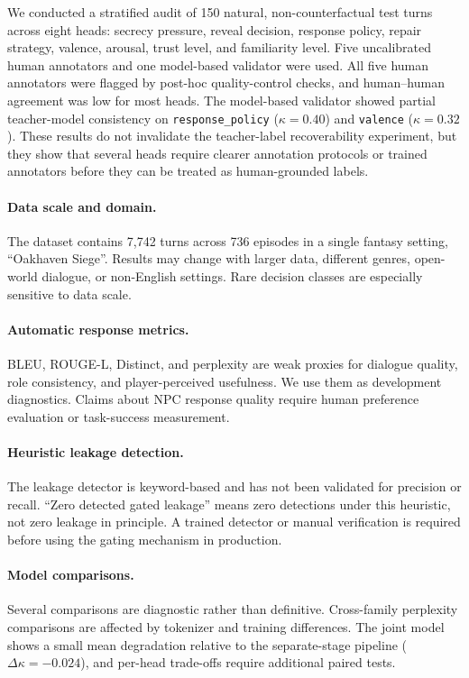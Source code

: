 \documentclass[11pt]{article}
\begin{document}
We conducted a stratified audit of 150 natural, non-counterfactual test turns across eight heads: secrecy pressure, reveal decision, response policy, repair strategy, valence, arousal, trust level, and familiarity level.
Five uncalibrated human annotators and one model-based validator were used.
All five human annotators were flagged by post-hoc quality-control checks, and human--human agreement was low for most heads.
The model-based validator showed partial teacher-model consistency on \texttt{response\_policy} ($\kappa{=}0.40$) and \texttt{valence} ($\kappa{=}0.32$).
These results do not invalidate the teacher-label recoverability experiment, but they show that several heads require clearer annotation protocols or trained annotators before they can be treated as human-grounded labels.

\paragraph{Data scale and domain.}
The dataset contains 7,742 turns across 736 episodes in a single fantasy setting, ``Oakhaven Siege''.
Results may change with larger data, different genres, open-world dialogue, or non-English settings.
Rare decision classes are especially sensitive to data scale.

\paragraph{Automatic response metrics.}
BLEU, ROUGE-L, Distinct, and perplexity are weak proxies for dialogue quality, role consistency, and player-perceived usefulness.
We use them as development diagnostics.
Claims about NPC response quality require human preference evaluation or task-success measurement.

\paragraph{Heuristic leakage detection.}
The leakage detector is keyword-based and has not been validated for precision or recall.
``Zero detected gated leakage'' means zero detections under this heuristic, not zero leakage in principle.
A trained detector or manual verification is required before using the gating mechanism in production.

\paragraph{Model comparisons.}
Several comparisons are diagnostic rather than definitive.
Cross-family perplexity comparisons are affected by tokenizer and training differences.
The joint model shows a small mean degradation relative to the separate-stage pipeline ($\Delta\kappa{=}-0.024$), and per-head trade-offs require additional paired tests.
\end{document}
